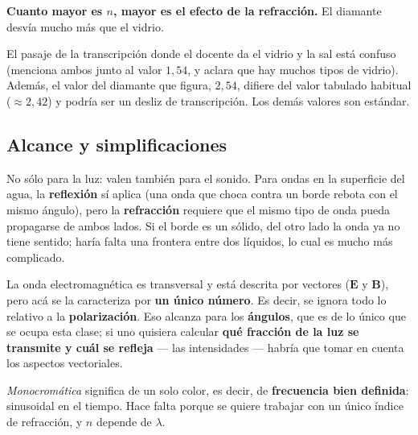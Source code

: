 \documentclass[12pt,a4paper]{article}
\begin{document}
\textbf{Cuanto mayor es $n$, mayor es el efecto de la refracción.} El diamante
desvía mucho más que el vidrio.

\begin{warnbox}
El pasaje de la transcripción donde el docente da el vidrio y la sal está confuso
(menciona ambos junto al valor $1{,}54$, y aclara que hay muchos tipos de
vidrio). Además, el valor del diamante que figura, $2{,}54$, difiere del valor
tabulado habitual ($\approx 2{,}42$) y podría ser un desliz de transcripción. Los
demás valores son estándar.
\end{warnbox}

\subsection{Alcance y simplificaciones}

\begin{notebox}
No sólo para la luz: valen también para el sonido. Para ondas en la superficie
del agua, la \textbf{reflexión} sí aplica (una onda que choca contra un borde
rebota con el mismo ángulo), pero la \textbf{refracción} requiere que el mismo
tipo de onda pueda propagarse de ambos lados. Si el borde es un sólido, del otro
lado la onda ya no tiene sentido; haría falta una frontera entre dos líquidos, lo
cual es mucho más complicado.
\end{notebox}

\begin{warnbox}
La onda electromagnética es transversal y está descrita por vectores
($\mathbf{E}$ y $\mathbf{B}$), pero acá se la caracteriza por \textbf{un único
número}. Es decir, se ignora todo lo relativo a la \textbf{polarización}. Eso
alcanza para los \textbf{ángulos}, que es de lo único que se ocupa esta clase; si
uno quisiera calcular \textbf{qué fracción de la luz se transmite y cuál se
refleja} --- las intensidades --- habría que tomar en cuenta los aspectos
vectoriales.
\end{warnbox}

\begin{notebox}
\emph{Monocromática} significa de un solo color, es decir, de \textbf{frecuencia
bien definida}: sinusoidal en el tiempo. Hace falta porque se quiere trabajar con
un único índice de refracción, y $n$ depende de $\lambda$.
\end{notebox}
\end{document}
